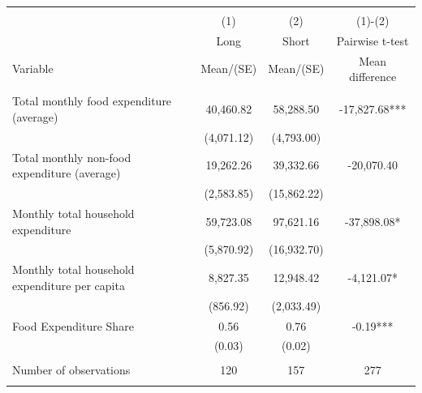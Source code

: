 
\begin{tabular}{@{\extracolsep{5pt}}lccc}
\\[-1.8ex]\hline \hline \\[-1.8ex]
 & \multicolumn{1}{c}{(1)}  & \multicolumn{1}{c}{(2)}  & \multicolumn{1}{c}{(1)-(2)} \\
 & \multicolumn{1}{c}{Long}  & \multicolumn{1}{c}{Short}  & \multicolumn{1}{c}{Pairwise t-test}  \\
Variable & Mean/(SE) & Mean/(SE) & Mean difference \\ \hline \\[-1.8ex] 
Total monthly food expenditure (average)   & 40,460.82    & 58,288.50    & -17,827.68***   \\
 & (4,071.12)  & (4,793.00)  &  \\ [1ex]
Total monthly non-food expenditure (average)   & 19,262.26    & 39,332.66    & -20,070.40   \\
 & (2,583.85)  & (15,862.22)  &  \\ [1ex]
Monthly total household expenditure   & 59,723.08    & 97,621.16    & -37,898.08*   \\
 & (5,870.92)  & (16,932.70)  &  \\ [1ex]
Monthly total household expenditure per capita   & 8,827.35    & 12,948.42    & -4,121.07*   \\
 & (856.92)  & (2,033.49)  &  \\ [1ex]
Food Expenditure Share   & 0.56    & 0.76    & -0.19***   \\
 & (0.03)  & (0.02)  &  \\ [1ex]
\hline \\[-1.8ex]
Number of observations  & 120   & 157  & 277  \\
\hline \hline \\[-1.8ex]

\end{tabular}
